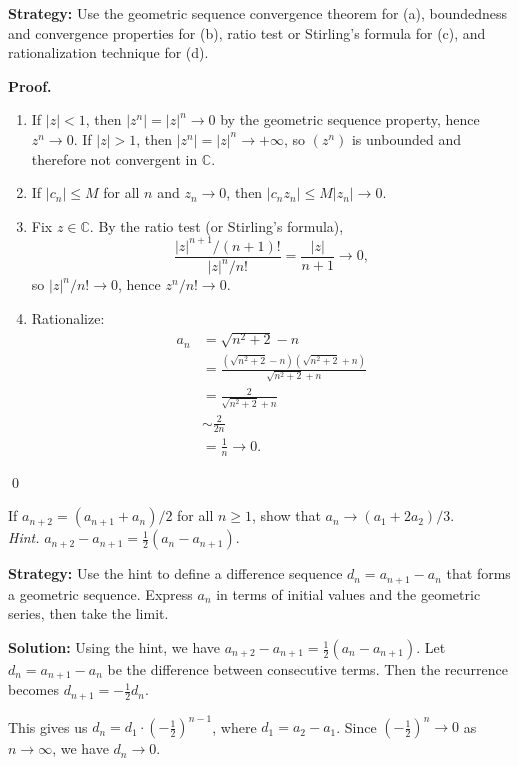 \noindent\textbf{Strategy:} Use the geometric sequence convergence theorem for (a), boundedness and convergence properties for (b), ratio test or Stirling's formula for (c), and rationalization technique for (d).

\noindent\textbf{Proof.}
\begin{enumerate}[label=(\alph*)]
\item If $|z|<1$, then $|z^n|=|z|^n\to 0$ by the geometric sequence property, hence $z^n\to 0$. If $|z|>1$, then $|z^n|=|z|^n\to +\infty$, so $(z^n)$ is unbounded and therefore not convergent in $\mathbb{C}$.
\item If $|c_n|\le M$ for all $n$ and $z_n\to 0$, then $|c_n z_n|\le M|z_n|\to 0$.
\item Fix $z\in\mathbb{C}$. By the ratio test (or Stirling's formula),
\[
\frac{|z|^{n+1}/(n+1)!}{|z|^n/n!}=\frac{|z|}{n+1}\to 0,
\]
so $|z|^n/n!\to 0$, hence $z^n/n!\to 0$.
\item Rationalize:
\begin{align*}
a_n&=\sqrt{n^2+2}-n\\
&=\frac{(\sqrt{n^2+2}-n)(\sqrt{n^2+2}+n)}{\sqrt{n^2+2}+n}\\
&=\frac{2}{\sqrt{n^2+2}+n}\\
&\sim \frac{2}{2n}\\
&=\frac{1}{n}\to 0.
\end{align*}
\end{enumerate}\qed
\medskip



\begin{problembox}
If $a_{n+2} = (a_{n+1} + a_n)/2$ for all $n \geq 1$, show that $a_n \to (a_1 + 2a_2)/3$. \\
\textit{Hint.} $a_{n+2} - a_{n+1} = \frac{1}{2}(a_n - a_{n+1})$.
\end{problembox}

\noindent\textbf{Strategy:} Use the hint to define a difference sequence $d_n = a_{n+1} - a_n$ that forms a geometric sequence. Express $a_n$ in terms of initial values and the geometric series, then take the limit.

\bigskip\noindent\textbf{Solution:}
Using the hint, we have $a_{n+2} - a_{n+1} = \frac{1}{2}(a_n - a_{n+1})$. Let $d_n = a_{n+1} - a_n$ be the difference between consecutive terms. Then the recurrence becomes $d_{n+1} = -\frac{1}{2}d_n$.

This gives us $d_n = d_1 \cdot \left(-\frac{1}{2}\right)^{n-1}$, where $d_1 = a_2 - a_1$. Since $\left(-\frac{1}{2}\right)^n \to 0$ as $n \to \infty$, we have $d_n \to 0$.

